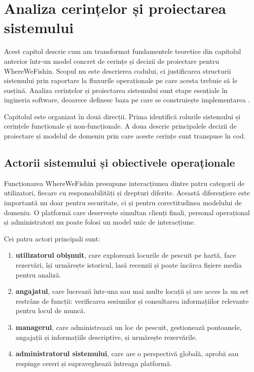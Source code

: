 ﻿\chapter{Analiza cerințelor și proiectarea sistemului}

Acest capitol descrie cum am transformat fundamentele teoretice din capitolul anterior într-un model concret de cerințe și decizii de proiectare pentru WhereWeFishin. Scopul nu este descrierea codului, ci justificarea structurii sistemului prin raportare la fluxurile operaționale pe care acesta trebuie să le susțină. Analiza cerințelor și proiectarea sistemului sunt etape esențiale în ingineria software, deoarece definesc baza pe care se construiește implementarea \citep{sommerville2015,pressman2014}.

Capitolul este organizat în două direcții. Prima identifică rolurile sistemului și cerințele funcționale și non-funcționale. A doua descrie principalele decizii de proiectare și modelul de domeniu prin care aceste cerințe sunt transpuse în cod.

\section{Actorii sistemului și obiectivele operaționale}

Funcționarea WhereWeFishin presupune interacțiunea dintre patru categorii de utilizatori, fiecare cu responsabilități și drepturi diferite. Această diferențiere este importantă nu doar pentru securitate, ci și pentru corectitudinea modelului de domeniu. O platformă care deservește simultan clienți finali, personal operațional și administratori nu poate folosi un model unic de interacțiune.

Cei patru actori principali sunt:

\begin{enumerate}
  \item \textbf{utilizatorul obișnuit}, care explorează locurile de pescuit pe hartă, face rezervări, își urmărește istoricul, lasă recenzii și poate încărca fișiere media pentru analiză.
  \item \textbf{angajatul}, care lucrează într-una sau mai multe locații și are acces la un set restrâns de funcții: verificarea sesiunilor și consultarea informațiilor relevante pentru locul de muncă.
  \item \textbf{managerul}, care administrează un loc de pescuit, gestionează pontoanele, angajații și informațiile descriptive, și urmărește rezervările.
  \item \textbf{administratorul sistemului}, care are o perspectivă globală, aprobă sau respinge cereri și supraveghează întreaga platformă.
\end{enumerate}

